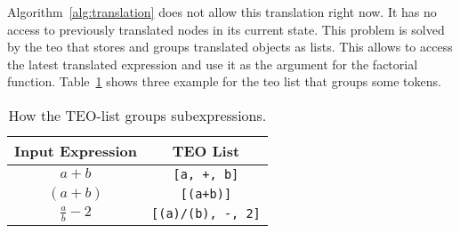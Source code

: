 Algorithm~\ref{alg:translation} does not allow this translation right now. It has no access to previously translated nodes in its current state. This problem is solved by the \gls*{teo} that stores and groups translated objects as lists. This allows to access the latest translated expression and use it as the argument for the factorial function. Table~\ref{tab:teo-list} shows three example for the \gls*{teo} list that groups some tokens.

\begin{table}[ht]
\centering
\begin{tabular}{cc}
	\hline
	Input Expression & TEO List\\
	\hline
	$a+b$ & \verb|[a, +, b]|\\
	$(a+b)$ & \verb|[(a+b)]|\\
	$\frac{a}{b}-2$ & \verb|[(a)/(b), -, 2]|\\
	\hline
\end{tabular}
\caption{How the TEO-list groups subexpressions.}
\label{tab:teo-list}
\end{table}





